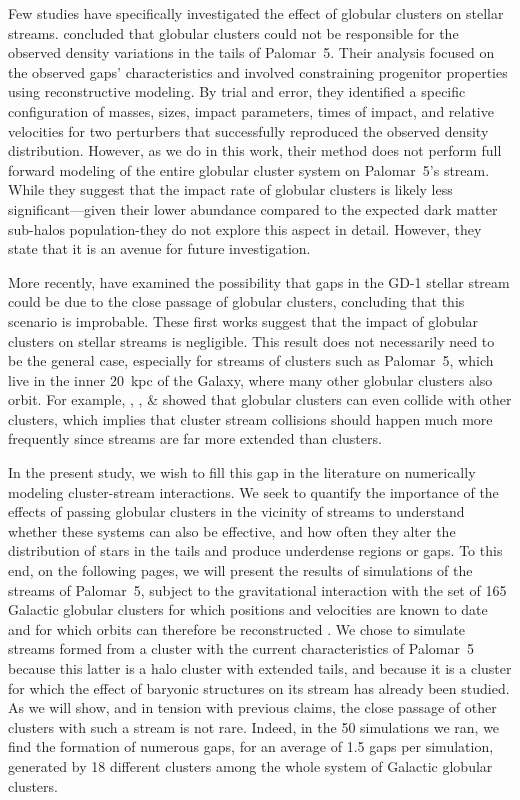 \documentclass{aa}
\begin{document}
  Few studies have specifically investigated the effect of globular clusters on stellar streams. \citet{2017MNRAS.470...60E} concluded that globular clusters could not be responsible for the observed density variations in the tails of Palomar~5. Their analysis focused on the observed gaps' characteristics and involved constraining progenitor properties using reconstructive modeling. By trial and error, they identified a specific configuration of masses, sizes, impact parameters, times of impact, and relative velocities for two perturbers that successfully reproduced the observed density distribution. However, as we do in this work, their method does not perform full forward modeling of the entire globular cluster system on Palomar~5's stream. While they suggest that the impact rate of globular clusters is likely less significant—given their lower abundance compared to the expected dark matter sub-halos population-they do not explore this aspect in detail. However, they state that it is an avenue for future investigation. 
  
  More recently, \citet{2022ApJ...941..129D} have examined the possibility that gaps in the GD-1 stellar stream could be due to the close passage of globular clusters, concluding that this scenario is improbable. These first works suggest that the impact of globular clusters on stellar streams is negligible. This result does not necessarily need to be the general case, especially for streams of clusters such as Palomar~5, which live in the inner 20~kpc of the Galaxy, where many other globular clusters also orbit. For example, \citet{2018A&A...620A.154}, \citet{2019A&A...622A..86M}, \& \citet{2023A&A...678A..69I} showed that globular clusters can even collide with other clusters, which implies that cluster stream collisions should happen much more frequently since streams are far more extended than clusters. 
  
  In the present study, we wish to fill this gap in the literature on numerically modeling cluster-stream interactions. We seek to quantify the importance of the effects of passing globular clusters in the vicinity of streams to understand whether these systems can also be effective, and how often they alter the distribution of stars in the tails and produce underdense regions or gaps. To this end, on the following pages, we will present the results of simulations of the streams of Palomar~5, subject to the gravitational interaction with the set of 165 Galactic globular clusters for which positions and velocities are known to date and for which orbits can therefore be reconstructed \citep{2021MNRAS.505.5957B}. We chose to simulate streams formed from a cluster with the current characteristics of Palomar~5 because this latter is a halo cluster with extended tails, and because it is a cluster for which the effect of baryonic structures on its stream has already been studied. As we will show, and in tension with previous claims, the close passage of other clusters with such a stream is not rare. Indeed, in the 50 simulations we ran, we find the formation of numerous gaps, for an average of 1.5 gaps per simulation, generated by 18 different clusters among the whole system of Galactic globular clusters.
\end{document}
